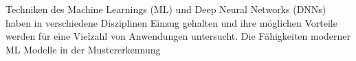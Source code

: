 \documentclass[draft,final]{vutinfth} %
\theoremstyle{break}
\begin{document}


\begin{kurzfassung}
Techniken des Machine Learnings (ML) und Deep Neural Networks (DNNs) haben in verschiedene Disziplinen Einzug gehalten und ihre möglichen Vorteile werden für eine Vielzahl von Anwendungen untersucht. Die Fähigkeiten moderner ML Modelle in der Mustererkennung

\end{kurzfassung}
\end{document}
